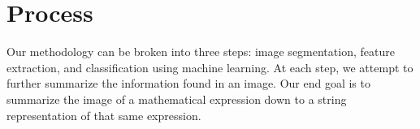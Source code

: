 \section{Process}

Our methodology can be broken into three steps: image segmentation, feature extraction, and classification using machine learning. At each step, we attempt to further summarize the information found in an image. Our end goal is to summarize the image of a mathematical expression down to a string representation of that same expression.
%

%

%

